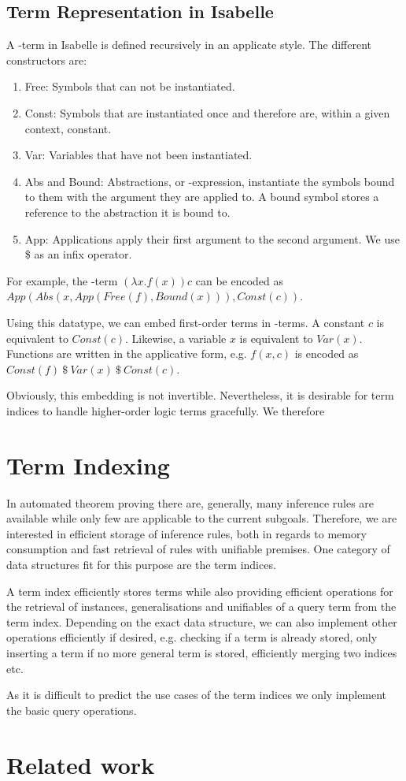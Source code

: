 \subsection{Term Representation in Isabelle}

A \lam -term in Isabelle is defined recursively in an applicate style. The different constructors are:
\begin{enumerate}
  \item Free: Symbols that can not be instantiated.
  \item Const: Symbols that are instantiated once and therefore are, within a given context, constant.
  \item Var: Variables that have not been instantiated.
  \item Abs and Bound: Abstractions, or \lam -expression, instantiate the symbols bound to them with the argument they are applied to. A bound symbol stores a reference to the abstraction it is bound to.
  \item App: Applications apply their first argument to the second argument. We use \$ as an infix operator.
\end{enumerate}
For example, the \lam -term $(\lambda x. f(x)) c$ can be encoded as $App(Abs(x,App(Free(f),Bound(x))),Const(c))$.

Using this datatype, we can embed first-order terms in \lam -terms. A constant $c$ is equivalent to $Const(c)$. Likewise, a variable $x$ is equivalent to $Var(x)$. Functions are written in the applicative form, e.g. $f(x,c)$ is encoded as $Const(f)\ \$\ Var(x)\ \$\ Const(c)$.

Obviously, this embedding is not invertible. Nevertheless, it is desirable for term indices to handle higher-order logic terms gracefully. We therefore \todo{}

\section{Term Indexing}
In automated theorem proving there are, generally, many inference rules are available while only few are applicable to the current subgoals. Therefore, we are interested in efficient storage of inference rules, both in regards to memory consumption and fast retrieval of rules with unifiable premises. One category of data structures fit for this purpose are the term indices.

A term index efficiently stores terms while also providing efficient operations for the retrieval of instances, generalisations and unifiables of a query term from the term index. Depending on the exact data structure, we can also implement other operations efficiently if desired, e.g. checking if a term is already stored, only inserting a term if no more general term is stored, efficiently merging two indices etc.

As it is difficult to predict the use cases of the term indices we only implement the basic query operations. 

\section{Related work}

